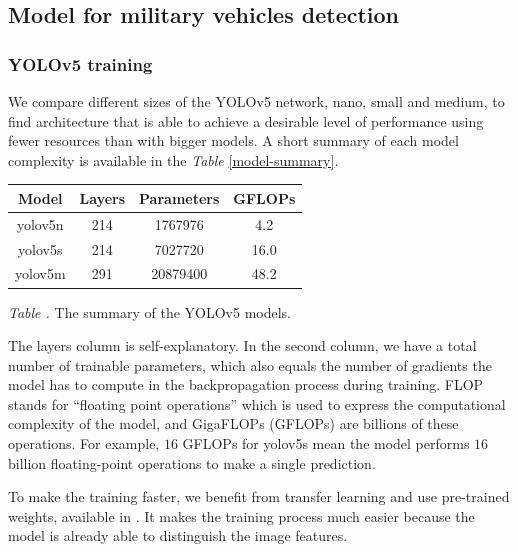 \documentclass[14pt,a4paper]{extarticle}
\newcounter{e}
\newcounter{tabl}
\newcommand{\tabl}[1]{\refstepcounter{tabl} \vspace{-0.3cm}\textit{Table \arabic{tabl}\label{#1}.}}
\numberwithin{equation}{section}
\numberwithin{figure}{section}
\begin{document}
\subsection{Model for military vehicles detection}
\subsubsection{YOLOv5 training}

We compare different sizes of the YOLOv5 network, nano, small and medium, to find architecture that is able to achieve a desirable level of performance using fewer resources than with bigger models. A short summary of each model complexity is available in the \textit{Table} \ref{model-summary}.
\begin{center}
    \begin{tabular}{|c|c|c|c|}
        \hline
        Model
        & Layers
        & Parameters
        & GFLOPs
        \\ \hline
        yolov5n
        & 214
        & 1767976
        & 4.2
        \\ \hline
        yolov5s
        & 214
        & 7027720
        & 16.0
        \\ \hline
        yolov5m
        & 291
        & 20879400
        & 48.2
        \\ \hline
    \end{tabular}
\end{center}
\begin{center}
    \tabl{model-summary} The summary of the YOLOv5 models.
\end{center}

The layers column is self-explanatory. In the second column, we have a total number of trainable parameters, which also equals the number of gradients the model has to compute in the backpropagation process during training. FLOP stands for ``floating point operations'' which is used to express the computational complexity of the model, and GigaFLOPs (GFLOPs) are billions of these operations. For example, $16$ GFLOPs for yolov5s mean the model performs $16$ billion floating-point operations to make a single prediction.

To make the training faster, we benefit from transfer learning and use pre-trained weights, available in \cite{yolov5}. It makes the training process much easier because the model is already able to distinguish the image features.
\end{document}
